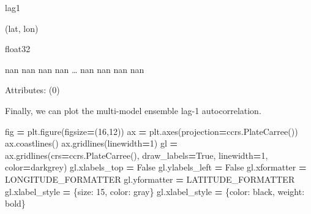 \documentclass[
]{book}
\newenvironment{Shaded}{\begin{snugshade}}{\end{snugshade}}
\newcommand{\DecValTok}[1]{\textcolor[rgb]{0.00,0.00,0.81}{#1}}
\newcommand{\NormalTok}[1]{#1}
\newcommand{\OperatorTok}[1]{\textcolor[rgb]{0.81,0.36,0.00}{\textbf{#1}}}
\newcommand{\StringTok}[1]{\textcolor[rgb]{0.31,0.60,0.02}{#1}}
\newcommand{\VariableTok}[1]{\textcolor[rgb]{0.00,0.00,0.00}{#1}}
\begin{document}
{lag1}

(lat, lon)

float32

nan nan nan nan \ldots{} nan nan nan nan

Attributes: {(0)}

Finally, we can plot the multi-model ensemble lag-1 autocorrelation.

\begin{Shaded}
\begin{Highlighting}[]
\NormalTok{fig }\OperatorTok{=}\NormalTok{ plt.figure(figsize}\OperatorTok{=}\NormalTok{(}\DecValTok{16}\NormalTok{,}\DecValTok{12}\NormalTok{))}
\NormalTok{ax }\OperatorTok{=}\NormalTok{ plt.axes(projection}\OperatorTok{=}\NormalTok{ccrs.PlateCarree())}
\NormalTok{ax.coastlines()}
\NormalTok{ax.gridlines(linewidth}\OperatorTok{=}\DecValTok{1}\NormalTok{)}
\NormalTok{gl }\OperatorTok{=}\NormalTok{ ax.gridlines(crs}\OperatorTok{=}\NormalTok{ccrs.PlateCarree(), draw\_labels}\OperatorTok{=}\VariableTok{True}\NormalTok{,}
\NormalTok{                 linewidth}\OperatorTok{=}\DecValTok{1}\NormalTok{, color}\OperatorTok{=}\StringTok{\textquotesingle{}darkgrey\textquotesingle{}}\NormalTok{)}
\NormalTok{gl.xlabels\_top }\OperatorTok{=} \VariableTok{False}
\NormalTok{gl.ylabels\_left }\OperatorTok{=} \VariableTok{False}
\NormalTok{gl.xformatter }\OperatorTok{=}\NormalTok{ LONGITUDE\_FORMATTER}
\NormalTok{gl.yformatter }\OperatorTok{=}\NormalTok{ LATITUDE\_FORMATTER}
\NormalTok{gl.xlabel\_style }\OperatorTok{=}\NormalTok{ \{}\StringTok{\textquotesingle{}size\textquotesingle{}}\NormalTok{: }\DecValTok{15}\NormalTok{, }\StringTok{\textquotesingle{}color\textquotesingle{}}\NormalTok{: }\StringTok{\textquotesingle{}gray\textquotesingle{}}\NormalTok{\}}
\NormalTok{gl.xlabel\_style }\OperatorTok{=}\NormalTok{ \{}\StringTok{\textquotesingle{}color\textquotesingle{}}\NormalTok{: }\StringTok{\textquotesingle{}black\textquotesingle{}}\NormalTok{, }\StringTok{\textquotesingle{}weight\textquotesingle{}}\NormalTok{: }\StringTok{\textquotesingle{}bold\textquotesingle{}}\NormalTok{\}}


\end{Highlighting}
\end{Shaded}
\end{document}
